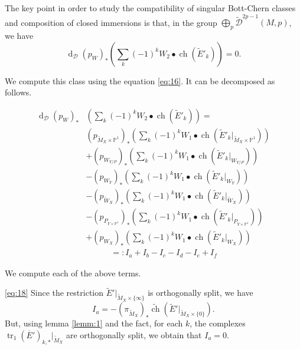 \documentclass[10pt,twoside]{article}
\numberwithin{equation}{section}
\theoremstyle{plain}
\theoremstyle{definition}
\DeclareMathOperator{\tr}{tr}
\DeclareMathOperator{\dd}{d}
\DeclareMathOperator{\ch}{ch}
\begin{document}
The key point in order to study the compatibility of singular
Bott-Chern classes and composition of closed immersions is that, in
the group $\bigoplus_{p}\widetilde{\mathcal{D}}^{2p-1}(M,p)$, we have
$$\dd_{\mathcal{D}}(p_{W})_{\ast}\left(\sum_{k}(-1)^{k}W_{2} \bullet 
\ch(\widetilde E'_{k})\right)=0.$$ 

We compute this class using the
equation \eqref{eq:16}. It can be decomposed as follows.

\begin{align*}
  \dd_{\mathcal{D}}(p_{W})_{\ast}&\left(\sum_{k}(-1)^{k}W_{2} \bullet \ch(\widetilde
    E'_{k})\right)=\\
  & (p_{\widetilde M_{X}\times \mathbb{P}^{1}})_{\ast}
  \left(\sum_{k}(-1)^{k}W_{1} \bullet \ch(\widetilde E'_{k}|_{\widetilde M_{X}\times
      \mathbb{P}^{1}})\right) \tag{a}\label{eq:18}\\
  & + (p_{W_{Y/P}})_{\ast} \left(\sum_{k}(-1)^{k}W_{1} \bullet \ch(\widetilde
    E'_{k}|_{W_{Y/P}})
    \right) \tag{b}\label{eq:19}\\
  & - (p_{W_{Y}})_{\ast}\left(\sum_{k}(-1)^{k}W_{1} \bullet 
    \ch(\widetilde E'_{k}|_{W_{Y}})\right)
  \tag{c}\label{eq:20}\\ 
  & - (p_{\widetilde W_{X}})_{\ast}\left(\sum_{k}(-1)^{k}W_{1} \bullet 
    \ch(\widetilde E'_{k}|_{\widetilde W_{X}})\right)
  \tag{d}\label{eq:21}\\ 
  & - (p_{P_{Y\times \mathbb{P}^{1}}})_{\ast}\left(\sum_{k}(-1)^{k}W_{1} \bullet 
    \ch(\widetilde E'_{k}|_{P_{Y\times \mathbb{P}^{1}}})
    \right) \tag{e}\label{eq:22}\\ 
  & +(p_{W_{X}})_{\ast}\left(\sum_{k}(-1)^{k}W_{1} \bullet 
    \ch(\widetilde E'_{k}|_{W_{X}})\right)
  \tag{f}\label{eq:23}\\ 
  &\phantom{AAAA}=\colon  I_{a}+I_{b}-I_{c}-I_{d}-I_{e}+I_{f}
\end{align*}

We compute each of the above terms. 

\eqref{eq:18} Since the restriction $\widetilde E'|_{\widetilde
  M_{X}\times \{\infty\}}$ is orthogonally split, we have 
\begin{displaymath}
  I_{a}=-(\pi _{\widetilde M_{X}})_{\ast}\widetilde {\ch}(\widetilde
  E'|_{\widetilde M_{X}\times \{0\}}).  
\end{displaymath}
But, using lemma \ref{lemm:1} and the fact, for each $k$, the
complexes $\tr_{1}(\overline E')_{k,\ast}|_{\widetilde M_{X}}$ are
orthogonally split, we obtain that $I_{a}=0$.
\end{document}
